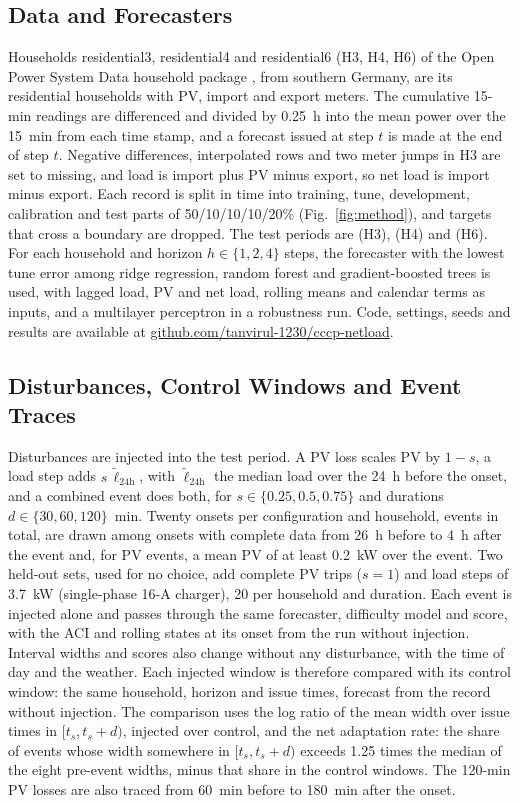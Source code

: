 \documentclass[conference,a4paper]{IEEEtran}
\begin{document}
\subsection{Data and Forecasters}
Households residential3, residential4 and residential6 (H3, H4, H6) of the Open Power System Data household
package \cite{opsd}, from southern Germany, are its residential households with PV, import and export
meters. The cumulative 15-min readings are differenced and divided by 0.25~h into the mean power over the 15~min from
each time stamp, and a forecast issued at step $t$ is made at the end of step $t$.
Negative differences, interpolated rows and two meter jumps in H3 are set to missing, and load is import plus PV
minus export, so net load is import minus export. Each record is split in time into training, tune,
development, calibration and test parts of 50/10/10/10/20\% (Fig.~\ref{fig:method}), and targets that cross a
boundary are dropped. The test periods are \testHThree{} (H3), \testHFour{} (H4) and \testHSix{} (H6). For each
household and horizon $h\in\{1,2,4\}$ steps, the forecaster with the lowest tune error among ridge regression,
random forest and gradient-boosted trees is used, with lagged load, PV and net load, rolling means and calendar
terms as inputs, and a multilayer perceptron in a robustness run. Code, settings, seeds and results are available at
\url{github.com/tanvirul-1230/cccp-netload}.

\subsection{Disturbances, Control Windows and Event Traces}
Disturbances are injected into the test period. A PV loss scales PV by $1-s$, a load step adds
$s\,\tilde\ell_{24\mathrm{h}}$, with $\tilde\ell_{24\mathrm{h}}$ the median load over the 24~h before the onset, and a
combined event does both, for $s\in\{0.25,0.5,0.75\}$ and durations $d\in\{30,60,120\}$~min. Twenty onsets per
configuration and household, \nExt{} events in total, are drawn among onsets with complete data from 26~h before
to 4~h after the event and, for PV events, a mean PV of at least 0.2~kW over the event. Two held-out sets, used for
no choice, add \nTrip{} complete PV trips ($s=1$) and \nEV{} load steps of 3.7~kW (single-phase 16-A charger), 20 per household and duration. Each event is injected
alone and passes through the same forecaster, difficulty model and score, with the ACI and rolling states at its
onset from the run without injection. Interval widths and scores also change without any
disturbance, with the time of day and the weather. Each injected window is therefore compared with its control
window: the same household, horizon and issue times, forecast from the record without injection. The comparison
uses the log ratio of the mean width over issue times in $[t_s,t_s+d)$, injected over control, and the net
adaptation rate: the share of events whose width somewhere in $[t_s,t_s+d)$ exceeds 1.25 times the median of the eight pre-event widths,
minus that share in the control windows. The 120-min PV losses are also traced from 60~min before to 180~min after
the onset.
\end{document}
